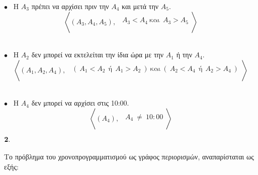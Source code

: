 \documentclass[10pt]{article}
\begin{document}
\vspace{5mm}

\hspace{5mm}$\bullet$ \ Η $A_{3}$ πρέπει να αρχίσει πριν την $A_{4}$ και μετά την $A_{5}$. \\
\[ 
\left<   (A_{3}, A_{4}, A_{5}) , 
\begin{array}{ll}
\\  \ \ A_{3} < A_{4} \ \text{και} \ \ A_{3} > A_{5} \\ \\
     
     \end{array} 
\right > \] 
\\ 

\vspace{5mm}

\hspace{5mm}$\bullet$ \ Η $A_{2}$ δεν μπορεί να εκτελείται την ίδια ώρα με την $A_{1}$ ή την $A_{4}$. \\
\[ 
\left<   (A_{1}, A_{2}, A_{4}) , 
\begin{array}{ll}
\\  \ \ (\  A_{1} < A_{2} \ \ \text{ή} \ \ A_{1} > A_{2} \ ) \ \text{και} \ ( \ A_{2} < A_{4} \ \ \text{ή} \ \ A_{2} > A_{4} \ ) \\ \\
     
     \end{array} 
\right > \] 
\\ 

\vspace{5mm}

\hspace{5mm}$\bullet$ \ Η $A_{4}$ δεν μπορεί να αρχίσει στις 10:00.\\
\[ 
\left<   (A_{4}) , 
\begin{array}{ll}
\\  \ \  A_{4} \ \neq  \ 10:00  \\ \\
     
     \end{array} 
\right > \] 

\vspace{5mm}

\hspace{5mm}$\bf 2. \normalfont$ \\ \\ 
Το πρόβλημα του χρονοπρογραμματισμού ως γράφος περιορισμών, αναπαρίσταται ως εξής: 

\vspace{7mm}
\end{document}

